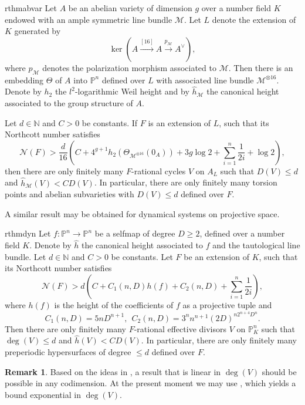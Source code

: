 \documentclass[11pt, a4paper, UKenglish]{amsart}
\newcommand{\N}{\mathcal N}
\newcommand{\sM}{\mathcal{M}}
\newcommand{\bbN}{\mathbb{N}}
\newcommand{\bbP}{\mathbb{P}}
\newcommand{\eqn}[1]{\begin{equation*}#1\end{equation*}}
\theoremstyle{definition}
\newtheorem{rk_}[thm_]{Remark}
\newcommand{\rk}[1]{\begin{rk_}#1\end{rk_}}
\begin{document}
\begin{restatable}{rthm}{abvar}
\label{abvar}Let $A$ be an abelian variety of dimension $g$ over a number field $K$ endowed with an ample symmetric line bundle $\sM$. Let $L$ denote the extension of $K$ generated by
\eqn{\ker\left( A \xrightarrow{[16]}A \xrightarrow{p_{\sM}} A^{\vee}\right),}
where $p_{\sM}$ denotes the polarization morphism associated to $\sM$. Then there is an embedding $\Theta$ of $A$ into $\bbP^n$ defined over $L$ with associated line bundle $\sM^{\otimes 16}$. Denote by $h_2$ the $l^2$-logarithmic Weil height and by $\hat{h}_{\sM}$ the canonical height associated to the group structure of $A$.

Let $d \in \bbN$ and $C > 0$ be constants. If $F$ is an extension of $L$, such that its Northcott number satisfies 
\eqn{\N(F) > \frac{d}{16}\left(C + 4^{g+1}h_2(\Theta_{\sM^{\otimes 16}}(0_A)) + 3g \log 2  + \sum_{i = 1}^n \frac{1}{2i}+\log 2 \right),} 
then there are only finitely many $F$-rational cycles $V$ on $A_L$ such that $D(V) \leq d$ and $\hat{h}_{\sM}(V) < CD(V)$. In particular, there are only finitely many torsion points and abelian subvarieties with $D(V) \leq d$ defined over $F$.
\end{restatable}

A similar result may be obtained for dynamical systems on projective space.

\begin{restatable}{rthm}{dyn}
\label{dyn}Let $f: \bbP^n \to \bbP^n$ be a selfmap of degree $D \geq 2$, defined over a number field $K$. Denote by $\hat{h}$ the canonical height associated to $f$ and the tautological line bundle. Let $d \in \bbN$ and $C > 0$ be constants. Let $F$ be an extension of $K$, such that its Northcott number satisfies \eqn{\N(F) > d\left(C +  C_1(n,D)h(f) + C_2(n,D) + \sum_{i = 1}^n \frac{1}{2i}\right),}
where $h(f)$ is the height of the coefficients of $f$ as a projective tuple and
\eqn{C_1(n,D)=5nD^{n+1},\ \ C_2(n,D)=3^n n^{n+1}(2D)^{n2^{n+4}D^n}.}
Then there are only finitely many $F$-rational effective divisors $V$ on $\bbP^n_K$ such that $\deg(V) \leq d$ and $\hat{h}(V) < CD(V)$. In particular, there are only finitely many preperiodic hypersurfaces of degree $\leq d$ defined over $F$.
\end{restatable}

\rk{Based on the ideas in \cite{ingram}, a result that is linear in $\deg(V)$ should be possible in any codimension. At the present moment we may use \cite[Theorem 4.12]{hutz}, which yields a bound exponential in $\deg(V)$.}
\end{document}
